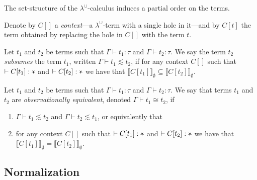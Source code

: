 \documentclass{llncs}
\newcommand{\LambdaUnion}{\lambda^\cup}
\newcommand{\LuBase}{\text{\rotatebox[origin=c]{180}{$\star$}}}
\newcommand{\LuEnv}{\Gamma}
\newcommand{\LuTm}{t}
\newcommand{\LuTy}{\tau}
\newcommand{\LuCtx}[1]{C\!\left[#1\right]}
\newcommand{\JudgeLuTy}[3][\LuEnv]{#1 \vdash #2 : #3}
\newcommand{\JudgeLuSub}[3][\LuEnv]{#1 \vdash #2 \lesssim #3}
\newcommand{\JudgeLuEqv}[3][\LuEnv]{#1 \vdash #2 \cong #3}
\newcommand{\LuDen}[2][\rho]{\llbracket #2 \rrbracket_{#1}}
\begin{document}
The set-structure of the $\LambdaUnion$-calculus induces a partial order on the terms.


\begin{definition}
Denote by $\LuCtx{}$ a \emph{context}---a $\LambdaUnion$-term with a single hole in it---and by $\LuCtx{\LuTm}$ the term obtained by replacing the hole in $\LuCtx{}$ with the term $\LuTm$.
\end{definition}

\begin{definition}\label{definition-subsumption}
    Let $\LuTm_1$ and $\LuTm_2$ be terms such that $\JudgeLuTy{\LuTm_1}{\LuTy}$ and $\JudgeLuTy{\LuTm_2}{\LuTy}$.
    We say the term $\LuTm_2$ \emph{subsumes} the term $\LuTm_1$, written $\JudgeLuSub{\LuTm_1}{\LuTm_2}$, if for any context $\LuCtx{}$ such that $\JudgeLuTy[]{\LuCtx{\LuTm_1}}{\LuBase}$ and $\JudgeLuTy[]{\LuCtx{\LuTm_2}}{\LuBase}$ we have that $\LuDen[\emptyset]{\LuCtx{\LuTm_1}} \subseteq \LuDen[\emptyset]{\LuCtx{\LuTm_2}}$.
\end{definition}

\begin{definition}
    Let $\LuTm_1$ and $\LuTm_2$ be terms such that $\JudgeLuTy{\LuTm_1}{\LuTy}$ and $\JudgeLuTy{\LuTm_2}{\LuTy}$.
    We say that terms $\LuTm_1$ and $\LuTm_2$ are \emph{observationally equivalent}, denoted $\JudgeLuEqv{\LuTm_1}{\LuTm_2}$, if
    \begin{enumerate}
        \item $\JudgeLuSub{\LuTm_1}{\LuTm_2}$ and $\JudgeLuSub{\LuTm_2}{\LuTm_1}$, or equivalently that
        \item for any context $\LuCtx{}$ such that $\JudgeLuTy[]{\LuCtx{\LuTm_1}}{\LuBase}$ and $\JudgeLuTy[]{\LuCtx{\LuTm_2}}{\LuBase}$ we have that $\LuDen[\emptyset]{\LuCtx{\LuTm_1}} = \LuDen[\emptyset]{\LuCtx{\LuTm_2}}$.
    \end{enumerate}
\end{definition}


\subsection{Normalization}
\end{document}
